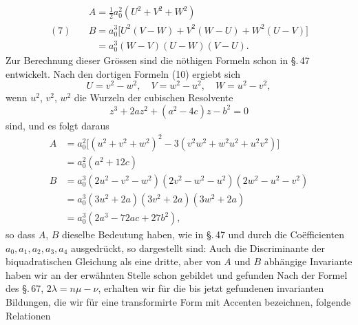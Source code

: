 \[
\begin{aligned}
& A = \tfrac{1}{2} a_0^2 (U^2 + V^2 + W^2) \\
(7)\quad & B = a_0^3 \bigl[U^2(V - W) + V^2(W - U) + W^2(U - V)\bigr] \\
& \phantom{B} = a_0^3 (W - V)(U - W)(V - U).
\end{aligned}
\]
Zur Berechnung dieser Grössen sind die nöthigen Formeln
schon in \S.\,47 entwickelt. Nach den dortigen Formeln (10) ergiebt sich
\[
U = v^2 - w^2, \quad V = w^2 - u^2, \quad W = u^2 - v^2,
\]
wenn $u^2$, $v^2$, $w^2$ die Wurzeln der cubischen Resolvente
\[
z^3 + 2 a z^2 + (a^2 - 4 c) z - b^2 = 0
\]
sind, und es folgt daraus
\[
\begin{aligned}
A &= a_0^2 \bigl[(u^2 + v^2 + w^2)^2 - 3 (v^2 w^2 + w^2 u^2 + u^2 v^2)\bigr] \\
&= a_0^2 (a^2 + 12 c) \\
B &= a_0^3 (2 u^2 - v^2 - w^2)(2 v^2 - w^2 - u^2)(2 w^2 - u^2 - v^2) \\
&= a_0^3 (3 u^2 + 2 a)(3 v^2 + 2 a)(3 w^2 + 2 a) \\
&= a_0^3 (2 a^3 - 72 a c + 27 b^2),
\end{aligned}
\]
so dass $A$, $B$ dieselbe Bedeutung haben, wie in \S.\,47 und durch
die Coëfficienten $a_0, a_1, a_2, a_3, a_4$ ausgedrückt, so dargestellt sind:
Auch die Discriminante der biquadratischen Gleichung als
eine dritte, aber von $A$ und $B$ abhängige Invariante
haben wir an der erwähnten Stelle schon gebildet und gefunden
Nach der Formel des \S.\,67, $2\lambda = n\mu - \nu$, erhalten wir für die
bis jetzt gefundenen invarianten Bildungen, die wir für eine
transformirte Form mit Accenten bezeichnen, folgende Relationen
